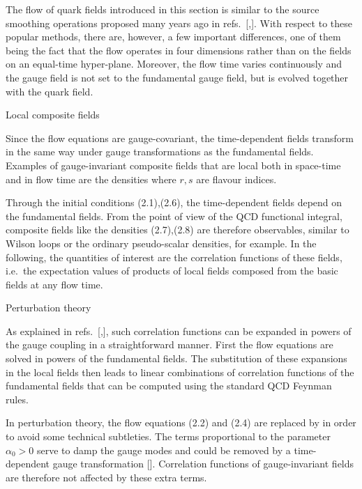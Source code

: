 The flow of quark fields introduced in this section 
is similar to the source 
smoothing operations proposed many years ago in
refs.~[\cite{Guesken},\cite{AlexandrouEtAl}].
With respect to these popular methods, there are, however, 
a few important differences,
one of them being the fact that the flow
operates in four dimensions rather than on the fields on an equal-time
hyper-plane. Moreover, the flow time varies continuously and the gauge field
is not set to the fundamental gauge field, but is
evolved together with the quark field. 


 Local composite fields

Since the flow equations are gauge-covariant, the time-dependent
fields transform in the same way under gauge transformations as
the fundamental fields. Examples of 
gauge-invariant composite fields
that are local both in space-time and in flow time are the densities
where $r,s$ are flavour indices.

Through the initial conditions (2.1),(2.6), 
the time-dependent fields depend on the 
fundamental fields. 
From the point of view of the QCD functional 
integral, composite fields like the densities (2.7),(2.8)
are therefore observables, similar to Wilson loops or the 
ordinary pseudo-scalar densities, for example.
In the following, the quantities of
interest are the correlation functions of 
these fields,
i.e.~the expectation values of products of local fields composed 
from the basic fields at any flow time. 


 Perturbation theory

As explained in refs.~[\cite{WilsonFlow},\cite{RenFlow}],
such correlation functions can be expanded in powers of the 
gauge coupling in a straightforward manner. 
First the flow equations are solved in powers of 
the fundamental fields. The substitution of 
these expansions in the local fields then leads to linear 
combinations
of correlation functions of the fundamental fields that
can be computed using the standard QCD Feynman rules.

In perturbation theory,
the flow equations (2.2) and (2.4) are replaced by
in order to avoid some technical subtleties.
The terms proportional to the parameter $\alpha_0>0$ 
serve to damp the gauge modes
and could be removed by a time-dependent gauge transformation
[\cite{WilsonFlow}].
Correlation functions of gauge-invariant 
fields are therefore not affected by these extra terms.

